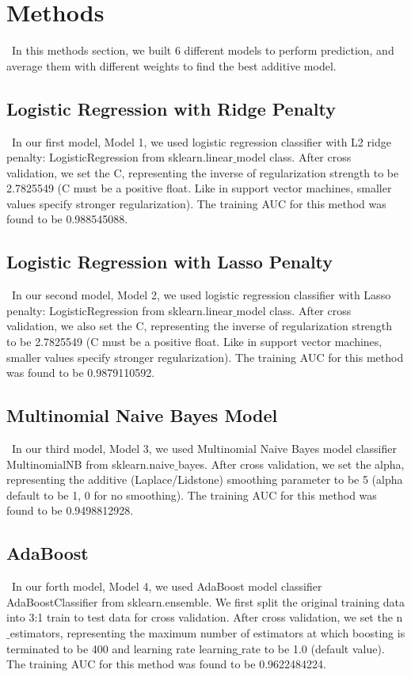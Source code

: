 \documentclass[12pt]{article}
\begin{document}
\section{Methods}
\quad\  In this methods section, we built 6 different models to perform prediction, and average them with different weights to find the best additive model.

\subsection{Logistic Regression with Ridge Penalty}
\quad\ In our first model, Model 1, we used logistic regression classifier with L2 ridge penalty: LogisticRegression from sklearn.linear${\_}$model class. After cross validation, we set the C, representing the inverse of regularization strength to be 2.7825549 (C must be a positive float. Like in support vector machines, smaller values specify stronger regularization). The training AUC for this method was found to be 0.988545088.

\subsection{Logistic Regression with Lasso Penalty}
\quad\ In our second model, Model 2, we used logistic regression classifier with Lasso penalty: LogisticRegression from sklearn.linear${\_}$model class. After cross validation, we also set the C, representing the inverse of regularization strength to be 2.7825549 (C must be a positive float. Like in support vector machines, smaller values specify stronger regularization). The training AUC for this method was found to be 0.9879110592.

\subsection{Multinomial Naive Bayes Model}
\quad\ In our third model, Model 3, we used Multinomial Naive Bayes model classifier MultinomialNB from sklearn.naive${\_}$bayes. After cross validation, we set the alpha, representing the additive (Laplace/Lidstone) smoothing parameter  to be 5 (alpha default to be 1, 0 for no smoothing). The training AUC for this method was found to be 0.9498812928.

\subsection{AdaBoost}
\quad\ In our forth model, Model 4, we used AdaBoost model classifier AdaBoostClassifier from sklearn.ensemble. We first split the original training data into 3:1 train to test data for cross validation. After cross validation, we set the n${\_}$estimators, representing the maximum number of estimators at which boosting is terminated to be 400 and learning rate learning${\_}$rate to be 1.0 (default value). The training AUC for this method was found to be 0.9622484224.
\end{document}
